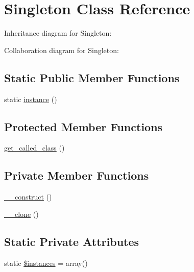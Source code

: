 \hypertarget{classSingleton}{
\section{Singleton Class Reference}
\label{classSingleton}
}


Inheritance diagram for Singleton:


Collaboration diagram for Singleton:
\subsection*{Static Public Member Functions}
\begin{DoxyCompactItemize}
\item 
static \hyperlink{classSingleton_a0deb004950b8dc4f51836316fd19c111}{instance} ()
\end{DoxyCompactItemize}
\subsection*{Protected Member Functions}
\begin{DoxyCompactItemize}
\item 
\hyperlink{classSingleton_a62c7f191f58ebf6de6ee2eaf8dbab987}{get\_\-called\_\-class} ()
\end{DoxyCompactItemize}
\subsection*{Private Member Functions}
\begin{DoxyCompactItemize}
\item 
\hyperlink{classSingleton_a095c5d389db211932136b53f25f39685}{\_\-\_\-construct} ()
\item 
\hyperlink{classSingleton_ad0cb87b388bc74d63dc884accdca8713}{\_\-\_\-clone} ()
\end{DoxyCompactItemize}
\subsection*{Static Private Attributes}
\begin{DoxyCompactItemize}
\item 
static \hyperlink{classSingleton_a1a63b63bdad280ed9a89dfed1fadc771}{\$instances} = array()
\end{DoxyCompactItemize}


